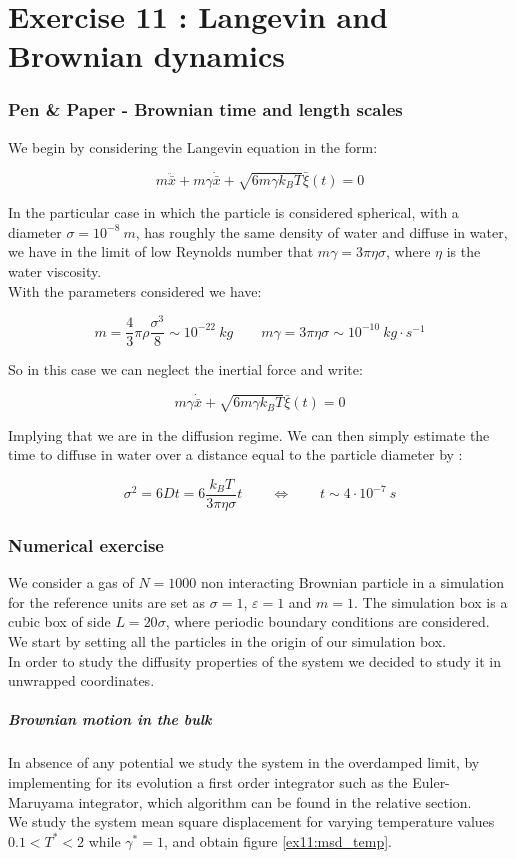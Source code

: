 \chapter*{Exercise 11 : Langevin and Brownian dynamics}
\subsection*{Pen \& Paper - Brownian time and length scales}
We begin by considering the Langevin equation in the form:

$$ m\ddot{\bar{x}} + m\gamma\dot{\bar{x}} + \sqrt{6 m \gamma k_BT} \bar{\xi}(t) = 0 $$

In the particular case in which the particle is considered spherical, with a diameter $\sigma = 10^{-8}\ m$, has roughly the same density of water and diffuse in water, we have
in the limit of low Reynolds number that $m\gamma = 3 \pi \eta \sigma$, where $\eta$ is the water viscosity.\\
With the parameters considered we have:

$$ m = \frac{4}{3}\pi \rho\frac{\sigma^3}{8} \sim 10^{-22}\ kg \qquad m\gamma = 3 \pi \eta \sigma \sim 10^{-10}\ kg \cdot s^{-1} $$

So in this case we can neglect the inertial force and write:

$$ m\gamma\dot{\bar{x}} + \sqrt{6 m \gamma k_BT} \bar{\xi}(t) = 0 $$

Implying that we are in the diffusion regime. We can then simply estimate the time to diffuse in water over a distance equal to the particle diameter by :

$$ \sigma ^ 2 = 6Dt = 6 \frac{k_BT}{3\pi\eta\sigma} t \qquad \iff \qquad t \sim 4 \cdot 10^{-7}\ s $$

\subsection*{Numerical exercise} We consider a gas of $N = 1000$ non interacting Brownian particle in a simulation for the reference units are set as $\sigma = 1$, $\varepsilon = 1$ and $m=1$. 
The simulation box is a cubic box of side $L = 20\sigma$, where periodic boundary conditions are considered. We start by setting all the particles in the origin of our simulation box. \\
In order to study the diffusity properties of the system we decided to study it in unwrapped coordinates. \\
\paragraph{Brownian motion in the bulk} In absence of any potential we study the system in the overdamped limit, by implementing for its evolution a first order integrator such as the Euler-Maruyama integrator, which algorithm can be found in the relative section. \\
We study the system mean square displacement for varying temperature values $0.1 < T^* < 2$ while $\gamma^* = 1$, and obtain figure \ref{ex11:msd_temp}.

